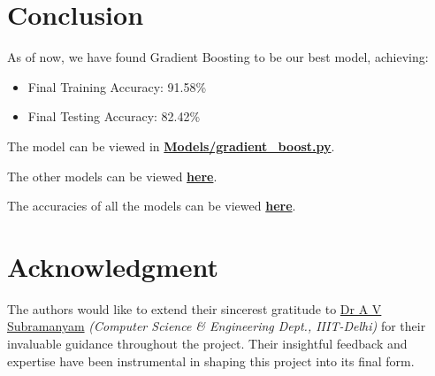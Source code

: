 \documentclass[conference]{IEEEtran}
\begin{document}
\section{Conclusion}
    As of now, we have found Gradient Boosting to be our best model, achieving:

    \begin{itemize}
        \item Final Training Accuracy: 91.58\%
        \item Final Testing Accuracy: 82.42\%
    \end{itemize}

    The model can be viewed in \href{https://github.com/Vikranth3140/Movie-Revenue-Prediction/blob/main/models/gradient_boost.py}{\textbf{Models/gradient\_boost.py}}.

    The other models can be viewed \href{https://github.com/Vikranth3140/Movie-Revenue-Prediction/tree/main/models}{\textbf{here}}.

    The accuracies of all the models can be viewed \href{https://github.com/Vikranth3140/Movie-Revenue-Prediction/blob/main/models/accuracies.text}{\textbf{here}}.

\section*{Acknowledgment}
    The authors would like to extend their sincerest gratitude to \href{https://www.iiitd.ac.in/subramanyam}{Dr A V Subramanyam} \textit{(Computer Science \& Engineering Dept., IIIT-Delhi)} for their invaluable guidance throughout the project.
    Their insightful feedback and expertise have been instrumental in shaping this project into its final form.
\end{document}
